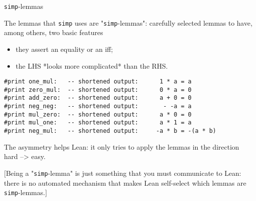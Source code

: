 \documentclass{beamer}
\begin{document}
\begin{frame}[fragile]{{\texttt{simp}}-lemmas}

The lemmas that {\verb`simp`} uses are "{\verb`simp`}-lemmas": carefully selected lemmas to have, among others, two basic features
\begin{itemize}
\item
  they assert an equality or an iff;
\item
  the LHS *looks more complicated* than the RHS.
\end{itemize}

\begin{verbatim}
#print one_mul:   -- shortened output:      1 * a = a
#print zero_mul:  -- shortened output:      0 * a = 0
#print add_zero:  -- shortened output:      a + 0 = 0
#print neg_neg:   -- shortened output:       - -a = a
#print mul_zero:  -- shortened output:      a * 0 = 0
#print mul_one:   -- shortened output:      a * 1 = a
#print neg_mul:   -- shortened output:     -a * b = -(a * b)
\end{verbatim}

The asymmetry helps Lean: it only tries to apply the lemmas in the direction hard --> easy.

[Being a "{\verb`simp`}-lemma" is just something that you must communicate to Lean: there is no automated mechanism that makes Lean self-select which lemmas are {\verb`simp`}-lemmas.]
\end{frame}
\end{document}
